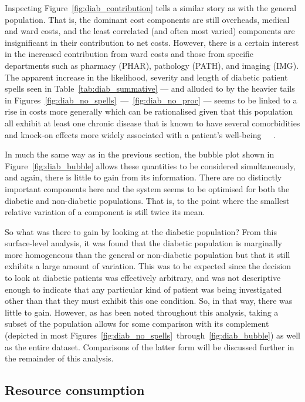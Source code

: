 Inspecting Figure~\ref{fig:diab_contribution} tells a similar story as with the
general population. That is, the dominant cost components are still overheads,
medical and ward costs, and the least correlated (and often most varied)
components are insignificant in their contribution to net costs. However, there
is a certain interest in the increased contribution from ward costs and those
from specific departments such as pharmacy (PHAR), pathology (PATH), and imaging
(IMG). The apparent increase in the likelihood, severity and length of diabetic
patient spells seen in Table~\ref{tab:diab_summative} --- and alluded to by the
heavier tails in
Figures~\ref{fig:diab_no_spells}~---~\ref{fig:diab_no_proc} --- seems to
be linked to a rise in costs more generally which can be rationalised given
that this population all exhibit at least one chronic disease that is known to
have several comorbidities and knock-on effects more widely associated with a
patient's well-being~\cite{Deschenes2015}~\cite{Klimek2015}~\cite{Walker2016}.

In much the same way as in the previous section, the bubble plot shown in
Figure~\ref{fig:diab_bubble} allows these quantities to be considered
simultaneously, and again, there is little to gain from its information. There
are no distinctly important components here and the system seems to be optimised
for both the diabetic and non-diabetic populations. That is, to the point where
the smallest relative variation of a component is still twice its mean.

So what was there to gain by looking at the diabetic population? From this
surface-level analysis, it was found that the diabetic population is marginally
more homogeneous than the general or non-diabetic population but that it still
exhibits a large amount of variation. This was to be expected since the decision
to look at diabetic patients was effectively arbitrary, and was not descriptive
enough to indicate that any particular kind of patient was being investigated
other than that they must exhibit this one condition. So, in that way, there was
little to gain. However, as has been noted throughout this analysis, taking a
subset of the population allows for some comparison with its complement
(depicted in most
Figures~\ref{fig:diab_no_spells}~through~\ref{fig:diab_bubble}) as well
as the entire dataset. Comparisons of the latter form will be discussed further
in the remainder of this analysis.


\subsection{Resource consumption}\label{subsec:diab_resources}

